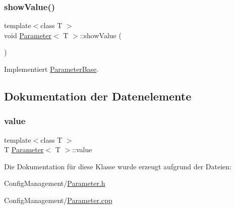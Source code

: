 \hypertarget{class_parameter_ab0091864db90216ee76ee9084422b380}{}\label{class_parameter_ab0091864db90216ee76ee9084422b380} 
\subsubsection{\texorpdfstring{show\+Value()}{showValue()}}
{\footnotesize\ttfamily template$<$class T $>$ \\
void \hyperlink{class_parameter}{Parameter}$<$ T $>$\+::show\+Value (\begin{DoxyParamCaption}{ }\end{DoxyParamCaption})\hspace{0.3cm}{\ttfamily [virtual]}}



Implementiert \hyperlink{class_parameter_base_ad09b4d79a05987d903a7d97e16649df7}{Parameter\+Base}.



\subsection{Dokumentation der Datenelemente}
\hypertarget{class_parameter_a5dcbb3f478f204d7931eec2b3ed66117}{}\label{class_parameter_a5dcbb3f478f204d7931eec2b3ed66117} 
\subsubsection{\texorpdfstring{value}{value}}
{\footnotesize\ttfamily template$<$class T $>$ \\
T \hyperlink{class_parameter}{Parameter}$<$ T $>$\+::value}



Die Dokumentation für diese Klasse wurde erzeugt aufgrund der Dateien\+:\begin{DoxyCompactItemize}
\item 
Config\+Management/\hyperlink{_parameter_8h}{Parameter.\+h}\item 
Config\+Management/\hyperlink{_parameter_8cpp}{Parameter.\+cpp}\end{DoxyCompactItemize}
